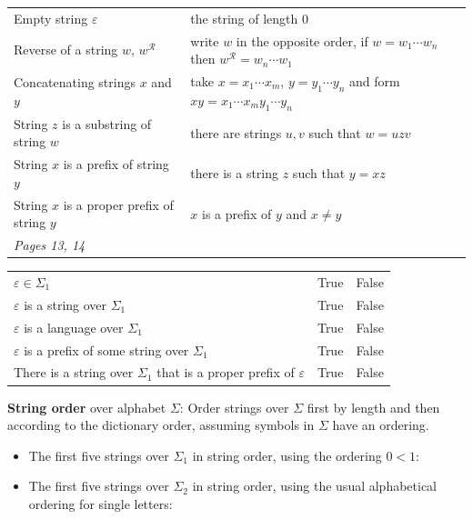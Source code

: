 \documentclass[12pt, oneside]{article}
\begin{document}
    \begin{center}
    \begin{tabular}{|ll|}
    \hline
    Empty string $\varepsilon$ & the string of length 0\\
    Reverse of a string $w$, $w^\mathcal{R}$  & write $w$  in  the opposite order, if $w = w_1 \cdots  w_n$ then $w^\mathcal{R} = w_n \cdots  w_1$\\
    Concatenating strings $x$ and $y$ & take $x = x_1 \cdots x_m$, $y=y_1 \cdots y_n$ and form $xy = x_1 \cdots x_m y_1 \cdots y_n$\\
    String $z$ is a substring of string $w$ & there are strings $u,v$ such that $w = uzv$\\
    String $x$ is a prefix of string $y$ & there is a string $z$ such that $y = xz$ \\
    String $x$ is a proper prefix of string $y$ & $x$ is a prefix of $y$ and $x \neq y$\\
    \hline
    {\it Pages 13, 14} & \\
    \hline
    \end{tabular}
    \end{center}
    
    \begin{center}
    \begin{tabular}{lcc}
    $\varepsilon \in \Sigma_1$ & True & False \\
    $\varepsilon$ is  a string over $\Sigma_1$ & True & False \\
    $\varepsilon$ is a language over $\Sigma_1$ & True & False \\
    $\varepsilon$ is a prefix of some string over  $\Sigma_1$ & True & False \\
    There is a string over $\Sigma_1$ that is a proper prefix of $\varepsilon$& True & False \\
    \end{tabular}
    \end{center}
    
    
    {\bf String order} over alphabet $\Sigma$: Order strings over  $\Sigma$ first by length and then according to the dictionary order, assuming symbols in $\Sigma$  have an ordering.
    
    \begin{itemize}
    \setlength{\itemsep}{10pt}
    \item[] The first five strings over $\Sigma_1$ in string order, using the ordering $0 <  1$:
    
    \item[] The first five strings over $\Sigma_2$ in string order, using the usual alphabetical ordering for single letters:
    
    \end{itemize}
    
\end{document}
